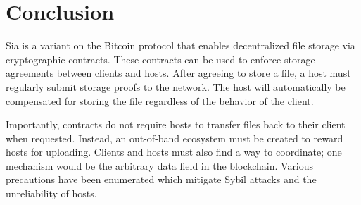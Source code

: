 \documentclass[twocolumn]{article}
\begin{document}




\section{Conclusion}
Sia is a variant on the Bitcoin protocol that enables decentralized file storage via cryptographic contracts.
These contracts can be used to enforce storage agreements between clients and hosts.
After agreeing to store a file, a host must regularly submit storage proofs to the network.
The host will automatically be compensated for storing the file regardless of the behavior of the client.

Importantly, contracts do not require hosts to transfer files back to their client when requested.
Instead, an out-of-band ecosystem must be created to reward hosts for uploading.
Clients and hosts must also find a way to coordinate; one mechanism would be the arbitrary data field in the blockchain.
Various precautions have been enumerated which mitigate Sybil attacks and the unreliability of hosts.
\end{document}

